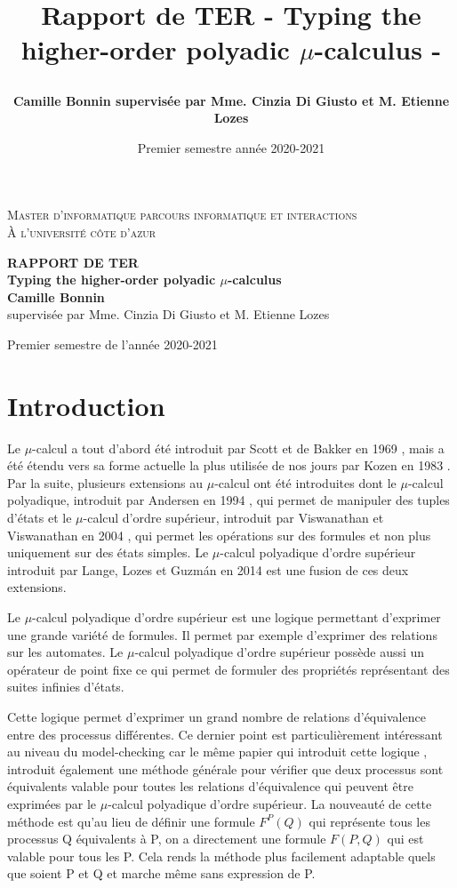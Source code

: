 \documentclass[11pt,a4paper]{article}
\title{\begin{minipage}\linewidth
        \centering\bfseries\sffamily
        Rapport de TER
        \vskip3pt
        \large - Typing the higher-order polyadic $\mu$-calculus -
    \end{minipage}}
\author{\begin{minipage}\linewidth
        \centering\bfseries
        Camille Bonnin
        \vskip3pt
        \large supervisée par Mme. Cinzia Di Giusto et M. Etienne Lozes
    \end{minipage}}
\date{Premier semestre année 2020-2021}
\theoremstyle{plain}
\theoremstyle{remark}
\theoremstyle{definition}
\begin{document}
\thispagestyle{empty}
\begin{center}
\Large{\textsc{Master d'informatique parcours informatique et interactions}}\\
\Large{\textsc{\`A l'université côte d'azur}}
\end{center}
\begin{center}
  \Huge{\textbf{RAPPORT DE TER}}\\[2cm]

  \huge{\textbf{Typing the higher-order polyadic $\mu$-calculus}}\\[2cm]
  \Large{\textbf{Camille Bonnin}\\[1cm]
  supervisée par Mme. Cinzia Di Giusto et M. Etienne Lozes}
\end{center}
\begin{center}
   \large{Premier semestre de l'année 2020-2021}
\end{center} 
\newpage 

\section*{Introduction}

Le $\mu$-calcul a tout d'abord été introduit par Scott et de Bakker en 1969 \cite{scott1969theory}, mais a été étendu vers sa forme actuelle la plus utilisée de nos jours par Kozen en 1983 \cite{kozen1983results}. Par la suite, plusieurs extensions au 
$\mu$-calcul ont été introduites dont le $\mu$-calcul polyadique, introduit par Andersen en 1994 \cite{andersen1994polyadic}, qui permet de manipuler des tuples d'états et le $\mu$-calcul d'ordre supérieur, introduit par Viswanathan et Viswanathan en 2004 \cite{viswanathan2004higher}, qui permet les opérations sur des formules et non plus uniquement sur des états simples. Le $\mu$-calcul polyadique d'ordre supérieur introduit par Lange, Lozes et Guzm{\'a}n en 2014 \cite{lange2014model} est une fusion de ces deux extensions.

Le $\mu$-calcul polyadique d'ordre supérieur est une logique permettant d'exprimer une grande variété de formules. Il permet par exemple d'exprimer des relations sur les automates. Le $\mu$-calcul polyadique d'ordre supérieur possède aussi un opérateur de point fixe ce qui permet de formuler des propriétés représentant des suites infinies d'états. 

Cette logique permet d'exprimer un grand nombre de relations d'équivalence entre des processus différentes. Ce dernier point est particulièrement intéressant au niveau du model-checking car le même papier qui introduit cette logique \cite{lange2014model}, introduit également une méthode générale pour vérifier que deux processus sont équivalents valable pour toutes les relations d'équivalence qui peuvent être exprimées par le $\mu$-calcul polyadique d'ordre supérieur. La nouveauté de cette méthode est qu'au lieu de définir une formule $F^P(Q)$ qui représente tous les processus Q équivalents à P, on a directement une formule $F(P, Q)$ qui est valable pour tous les P. Cela rends la méthode plus facilement adaptable quels que soient P et Q et marche même sans expression de P. 
\end{document}
